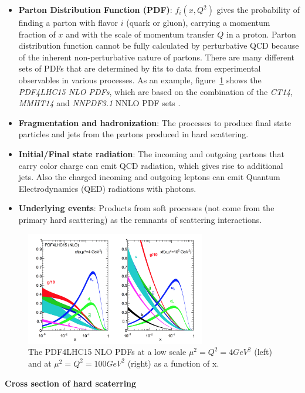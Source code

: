 \begin{itemize}
	\item \textbf{Parton Distribution Function (PDF)}: $f_{i}\left(x, Q^{2}\right)$ gives the probability of finding a parton with flavor $i$ (quark or gluon), carrying a momentum fraction of $x$ and with the scale of momentum transfer $Q$ in a proton. Parton distribution function cannot be fully calculated by perturbative QCD because of the inherent non-perturbative nature of partons. There are many different sets of PDFs that are determined by fits to data from experimental observables in various processes. As an example, figure~\ref{fig:C2_PDF4LHC15} shows the \textit{PDF4LHC15 NLO PDFs}, which are based on the combination of the \textit{CT14}, \textit{MMHT14} and \textit{NNPDF3.1} NNLO PDF sets \cite{Lin:2017snn}.
	\item \textbf{Fragmentation and hadronization}: The processes to produce final state particles and jets from the partons produced in hard scattering.
	\item \textbf{Initial/Final state radiation}: The incoming and outgoing partons that carry color charge can emit QCD radiation, which gives rise to additional jets. Also the charged incoming and outgoing leptons can emit Quantum Electrodynamics (QED) radiations with photons.
	\item \textbf{Underlying events}: Products from soft processes (not come from the primary hard scattering) as the remnants of scattering interactions.
\end{itemize}
\begin{figure}[!htb]
  \centering
  \includegraphics[width=0.7\textwidth]{figures/Theory/PDF4LHC15.png}
  \caption{The PDF4LHC15 NLO PDFs at a low scale $\mu^{2} = Q^{2} = 4 GeV^{2}$ (left) and at $\mu^{2} = Q^{2} = 100 GeV^{2}$ (right) as a function of x.}
  \label{fig:C2_PDF4LHC15}
\end{figure}

\textbf{Cross section of hard scaterring} 

